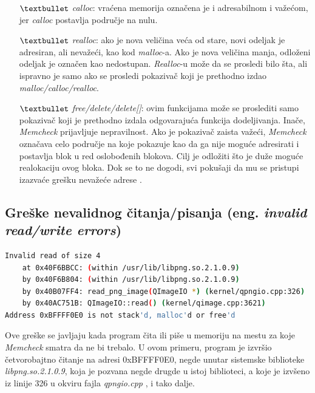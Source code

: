 \documentclass[12pt,oneside]{memoir}
\theoremstyle{plain}
\theoremstyle{definition}
\begin{document}
\begin{itemize}
\begin{itemize}
	\item[$\textbullet$] \textit{calloc}: vraćena memorija označena je i adresabilnom i važećom, jer \textit{calloc} postavlja područje na nulu.
	\item[$\textbullet$] \textit{realloc}: ako je nova veličina veća od stare, novi odeljak je adresiran, ali nevažeći, kao kod \textit{malloc}-a. Ako je nova veličina manja, odloženi odeljak je označen kao nedostupan. \textit{Realloc}-u može da se prosledi bilo šta, ali ispravno je samo ako se prosledi pokazivač koji je prethodno izdao \textit{malloc/calloc/realloc}.
	\item[$\textbullet$] \textit{free/delete/delete[]}: ovim funkcijama može se proslediti samo pokazivač koji je prethodno izdala odgovarajuća funkcija dodeljivanja. Inače, \textit{Memcheck} prijavljuje nepravilnost. Ako je pokazivač zaista važeći, \textit{Memcheck} označava celo područje na koje pokazuje kao da ga nije moguće adresirati i postavlja blok u red oslobođenih blokova. Cilj je odložiti što je duže moguće realokaciju ovog bloka. Dok se to ne dogodi, svi pokušaji da mu se pristupi izazvaće grešku nevažeće adrese \cite{ValgrindDOC}. 
	\end{itemize}
\end{itemize}

\subsection{Greške nevalidnog čitanja/pisanja (eng. \textit{invalid read/write errors})}

\begin{lstlisting}[style=terminal,caption={Primer ispisa greške nevalidnog čitanja \cite{Memcheck}}, label={lst:slika2.3},language={bash}]   
Invalid read of size 4
    at 0x40F6BBCC: (within /usr/lib/libpng.so.2.1.0.9)
    by 0x40F6B804: (within /usr/lib/libpng.so.2.1.0.9)
    by 0x40B07FF4: read_png_image(QImageIO *) (kernel/qpngio.cpp:326)
    by 0x40AC751B: QImageIO::read() (kernel/qimage.cpp:3621)
Address 0xBFFFF0E0 is not stack'd, malloc'd or free'd
\end{lstlisting}

Ove greške se javljaju kada program čita ili piše u memoriju na mestu za koje \textit{Memcheck} smatra da ne bi trebalo. U ovom primeru, program je izvršio četvorobajtno čitanje na adresi 0xBFFFF0E0, negde unutar sistemske biblioteke \textit{libpng.so.2.1.0.9}, koja je pozvana negde drugde u istoj biblioteci, a koje je izvšeno iz linije 326 u okviru fajla \textit{qpngio.cpp} , i tako dalje.
\end{document}
